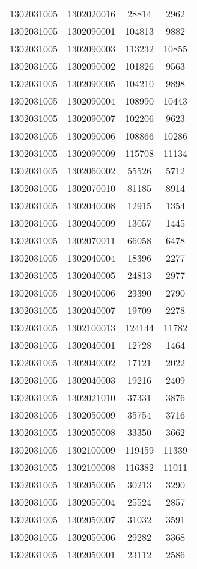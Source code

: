 \begin{longtable}[h]{llcc}
		1302031005 & 1302020016 & 28814 & 2962\\
		1302031005 & 1302090001 & 104813 & 9882\\
		1302031005 & 1302090003 & 113232 & 10855\\
		1302031005 & 1302090002 & 101826 & 9563\\
		1302031005 & 1302090005 & 104210 & 9898\\
		1302031005 & 1302090004 & 108990 & 10443\\
		1302031005 & 1302090007 & 102206 & 9623\\
		1302031005 & 1302090006 & 108866 & 10286\\
		1302031005 & 1302090009 & 115708 & 11134\\
		1302031005 & 1302060002 & 55526 & 5712\\
		1302031005 & 1302070010 & 81185 & 8914\\
		1302031005 & 1302040008 & 12915 & 1354\\
		1302031005 & 1302040009 & 13057 & 1445\\
		1302031005 & 1302070011 & 66058 & 6478\\
		1302031005 & 1302040004 & 18396 & 2277\\
		1302031005 & 1302040005 & 24813 & 2977\\
		1302031005 & 1302040006 & 23390 & 2790\\
		1302031005 & 1302040007 & 19709 & 2278\\
		1302031005 & 1302100013 & 124144 & 11782\\
		1302031005 & 1302040001 & 12728 & 1464\\
		1302031005 & 1302040002 & 17121 & 2022\\
		1302031005 & 1302040003 & 19216 & 2409\\
		1302031005 & 1302021010 & 37331 & 3876\\
		1302031005 & 1302050009 & 35754 & 3716\\
		1302031005 & 1302050008 & 33350 & 3662\\
		1302031005 & 1302100009 & 119459 & 11339\\
		1302031005 & 1302100008 & 116382 & 11011\\
		1302031005 & 1302050005 & 30213 & 3290\\
		1302031005 & 1302050004 & 25524 & 2857\\
		1302031005 & 1302050007 & 31032 & 3591\\
		1302031005 & 1302050006 & 29282 & 3368\\
		1302031005 & 1302050001 & 23112 & 2586\\

\end{longtable}
